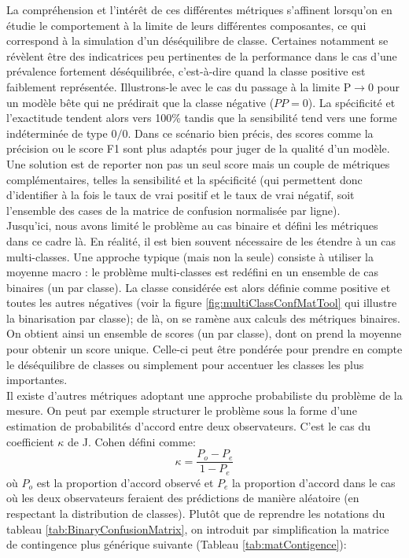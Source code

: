 La compréhension et l'intérêt de ces différentes métriques s'affinent lorsqu'on en étudie le comportement à la limite de leurs différentes composantes, ce qui correspond à la simulation d'un déséquilibre de classe. Certaines notamment se révèlent être des indicatrices peu pertinentes de la performance dans le cas d'une prévalence fortement déséquilibrée, c'est-à-dire quand la classe positive est faiblement représentée. Illustrons-le avec le cas du passage à la limite $\text{P} \to 0$ pour un modèle \og bête \fg qui ne prédirait que la classe négative ($PP=0$). La spécificité et l'exactitude tendent alors vers 100\% tandis que la sensibilité tend vers une forme indéterminée de type $0/0$. Dans ce scénario bien précis, des scores comme la précision ou le score F1 sont plus adaptés pour juger de la qualité d'un modèle. Une solution est de reporter non pas un seul score mais un couple de métriques complémentaires, telles la sensibilité et la spécificité (qui permettent donc d'identifier à la fois le taux de vrai positif et le taux de vrai négatif, soit l'ensemble des cases de la matrice de confusion normalisée par ligne).
\\
Jusqu'ici, nous avons limité le problème au cas binaire et défini les métriques dans ce cadre là. En réalité, il est bien souvent nécessaire de les étendre à un cas multi-classes. Une approche typique (mais non la seule) consiste à utiliser la moyenne \og macro \fg: le problème multi-classes est redéfini en un ensemble de cas binaires (un par classe). La classe considérée est alors définie comme positive et toutes les autres négatives (voir la figure \ref{fig:multiClassConfMatTool} qui illustre la binarisation par classe); de là, on se ramène aux calculs des métriques binaires. On obtient ainsi un ensemble de scores (un par classe), dont on prend la moyenne pour obtenir un score unique. Celle-ci peut être pondérée pour prendre en compte le déséquilibre de classes ou simplement pour accentuer les classes les plus importantes.
\\
Il existe d'autres métriques adoptant une approche probabiliste du problème de la mesure. On peut par exemple structurer le problème sous la forme d'une estimation de probabilités d'accord entre deux observateurs. C'est le cas du coefficient $\kappa$ de J. Cohen \cite{cohenWeightedKappaNominal1968} défini comme:
\begin{equation}
	\kappa  = \frac{P_o - P_e }{1 - P_e}
\end{equation}
où $P_o$ est la proportion d'accord observé et $P_e$ la proportion d'accord dans le cas où les deux observateurs feraient des prédictions de manière aléatoire (en respectant la distribution de classes). Plutôt que de reprendre les notations du tableau \ref{tab:BinaryConfusionMatrix}, on introduit par simplification la matrice de contingence plus générique suivante (Tableau \ref{tab:matContigence}):

